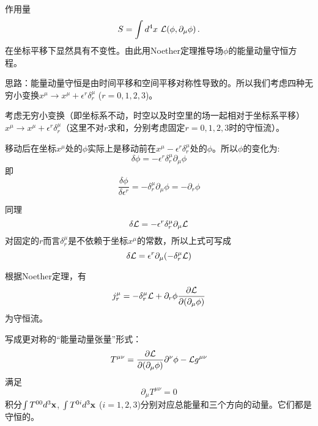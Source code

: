 \documentclass[CJK]{beamer}
\begin{document}
\begin{frame}
\bch
作用量
$$S = \int d^4x\ {\mathcal{L}}(\phi, \partial_\mu\phi)\,.$$
在坐标平移下显然具有不变性。由此用Noether定理推导场$\phi$的能量动量守恒方程。

\skipline

思路：能量动量守恒是由时间平移和空间平移对称性导致的。所以我们考虑四种无穷小变换$x^\mu \rightarrow x^\mu + \epsilon^r \delta_r^\mu$ ($r = 0, 1, 2, 3$)。
\ech
\end{frame}


\begin{frame}
\bch
考虑无穷小变换（即坐标系不动，时空以及时空里的场一起相对于坐标系平移）$x^\mu \rightarrow x^\mu + \epsilon^r \delta_r^\mu$（这里不对$r$求和，分别考虑固定$r=0,1,2,3$时的守恒流）。

移动后在坐标$x^\mu$处的$\phi$实际上是移动前在$x^\mu - \epsilon^r \delta_r^\mu$处的$\phi$。所以$\phi$的变化为:
$$\delta\phi = - \epsilon^r \delta_r^\mu \partial_\mu\phi$$
即
$$\frac{\delta\phi}{\delta\epsilon^r} = -\delta_r^\mu \partial_\mu \phi = -\partial_r\phi$$

\skipline

同理
$$\delta{\mathcal{L}} = - \epsilon^r \delta_r^\mu \partial_\mu{\mathcal{L}}$$
对固定的$r$而言$ \delta_r^\mu$是不依赖于坐标$x^\mu$的常数，所以上式可写成
$$\delta{\mathcal{L}} =\epsilon^r \partial_\mu (-  \delta_r^\mu {\mathcal{L}})$$

\ech
\end{frame}

\begin{frame}
\bch
根据Noether定理，有
$$j^\mu_r = - \delta_r^\mu {\mathcal{L}} +  \partial_r \phi\frac{\partial {\mathcal{L}}}{\partial (\partial_\mu \phi)}$$
为守恒流。

写成更对称的“能量动量张量”形式：
$$T^{\mu\nu} = \frac{\partial {\mathcal{L}}}{\partial (\partial_\mu \phi)}\partial^\nu\phi- {\mathcal{L}} g^{\mu\nu}$$
满足
$$\partial_\mu T^{\mu\nu} = 0$$
积分$\int T^{00} d^3{\mathbf{x}}$, $\int T^{0i}d^3{\mathbf{x}}$ ($i=1,2,3$)分别对应总能量和三个方向的动量。它们都是守恒的。
\ech
\end{frame}
\end{document}
